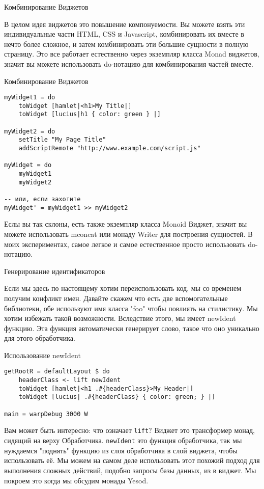 Комбинирование Виджетов

В целом идея виджетов это повышение компонуемости. Вы можете взять эти индивидуальные части HTML, CSS и Javascript, комбинировать их вместе в нечто более сложное, и затем комбинировать эти большие сущности в полную страницу. Это все работает естественно через экземпляр класса Monad виджетов, значит вы можете использовать do-нотацию для комбинирования частей вместе.

Комбинирование Виджетов

\begin{lstlisting}
myWidget1 = do
    toWidget [hamlet|<h1>My Title|]
    toWidget [lucius|h1 { color: green } |]

myWidget2 = do
    setTitle "My Page Title"
    addScriptRemote "http://www.example.com/script.js"

myWidget = do
    myWidget1
    myWidget2

-- или, если захотите
myWidget' = myWidget1 >> myWidget2
\end{lstlisting}

Еслы вы так склоны, есть также экземпляр класса Monoid Виджет, значит вы можете использовать mconcat или монаду Writer для построения сущностей. В моих экспериментах, самое легкое и самое естественное просто использовать do-нотацию.

Генерирование идентификаторов

Если мы здесь по настоящему хотим переиспользовать код, мы со временем получим конфликт имен. Давайте скажем что есть две вспомогательные библиотеки, обе используют имя класса "foo" чтобы повлиять на стилистику. Мы хотим избежать такой возможности. Вследствие этого, мы имеет newIdent функцию.  Эта функция автоматически генерирует слово, такое что оно уникально для этого обработчика.

Использование newIdent

\begin{lstlisting}
getRootR = defaultLayout $ do
    headerClass <- lift newIdent
    toWidget [hamlet|<h1 .#{headerClass}>My Header|]
    toWidget [lucius| .#{headerClass} { color: green; } |]

main = warpDebug 3000 W
\end{lstlisting}

Вам может быть интересно: что означает \lstinline'lift'? Виджет это трансформер монад, сидящий на верху Обработчика. \lstinline'newIdent' это функция обработчика, так мы нуждаемся "поднять" функцию из слоя обработчика в слой виджета, чтобы использовать её. Мы можем на самом деле использовать этот похожий подход для выполнения сложных действий, подобно запросы базы данных, из в виджет. Мы покроем это когда мы обсудим монады Yesod.

